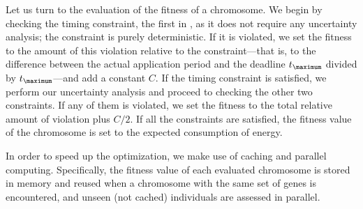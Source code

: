 Let us turn to the evaluation of the fitness of a chromosome. We begin by
checking the timing constraint, the first in , as it
does not require any uncertainty analysis; the constraint is purely
deterministic. If it is violated, we set the fitness to the amount of this
violation relative to the constraint---that is, to the difference between the
actual application period and the deadline $t_\maximum$ divided by
$t_\maximum$---and add a constant $C$. If the timing constraint is satisfied, we
perform our uncertainty analysis and proceed to checking the other two
constraints. If any of them is violated, we set the fitness to the total
relative amount of violation plus $C / 2$. If all the constraints are satisfied,
the fitness value of the chromosome is set to the expected consumption of
energy.

In order to speed up the optimization, we make use of caching and parallel
computing. Specifically, the fitness value of each evaluated chromosome is
stored in memory and reused when a chromosome with the same set of genes is
encountered, and unseen (not cached) individuals are assessed in parallel.
